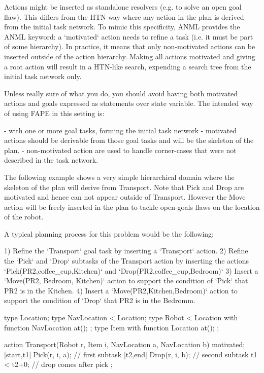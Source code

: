 Actions might be inserted as standalone resolvers (e.g. to solve an
open goal flaw).  This differs from the HTN way where any action in
the plan is derived from the initial task network.  To mimic this
specificity, ANML provides the ANML keyword: a `motivated` action
needs to refine a task (i.e. it must be part of some hierarchy).  In
practice, it means that only non-motivated actions can be inserted
outside of the action hierarchy.  Making all actions motivated and
giving a root action will result in a HTN-like search, expending a
search tree from the initial task network only.


Unless really sure of what you do, you should avoid having both
motivated actions and goals expressed as statements over state
variable.  The intended way of using FAPE in this setting is:

 - with one or more goal tasks, forming the initial task network
 - motivated actions should be derivable from those goal tasks and will be the skeleton of the plan.
 - non-motivated action are used to handle corner-cases that were not described in the task network.

The following example shows a very simple hierarchical domain where
the skeleton of the plan will derive from Transport. Note that Pick
and Drop are motivated and hence can not appear outside of Transport.
However the Move action will be freely inserted in the plan to tackle
open-goals flaws on the location of the robot.

A typical planning process for this problem would be the following:

1) Refine the `Transport` goal task by inserting a `Transport` action.
2) Refine the `Pick` and `Drop` subtasks of the Transport action by
inserting the actions `Pick(PR2,coffee_cup,Kitchen)` and `Drop(PR2,coffee_cup,Bedroom)`
3) Insert a `Move(PR2, Bedroom, Kitchen)` action to support the condition of `Pick` that PR2 is in the Kitchen.
4) Insert a `Move(PR2,Kitchen,Bedroom)` action to support the condition of `Drop` that PR2 is in the Bedromm.


    type Location;
    type NavLocation < Location;
    type Robot < Location with {
      function NavLocation at();
    };
    type Item with {
      function Location at();
    };

    action Transport(Robot r, Item i, NavLocation a, NavLocation b) {
      motivated;
      [start,t1] Pick(r, i, a); // first subtask
      [t2,end] Drop(r, i, b);   // second subtask
      t1 < t2+0;  // drop comes after pick
    };

